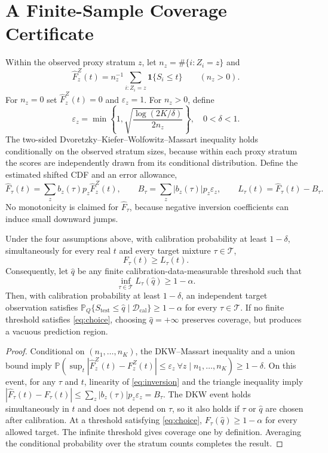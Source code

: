 \documentclass[twoside,11pt]{article}
\newcommand{\PR}{\mathbb{P}}
\begin{document}
\section{A Finite-Sample Coverage Certificate}
Within the observed proxy stratum $z$, let $n_z=\#\{i:Z_i=z\}$ and
\[ \widehat F_z^Z(t)= n_z^{-1}\sum_{i:Z_i=z}\mathbf 1\{S_i\leq t\}\qquad (n_z>0).\]
For $n_z=0$ set $\widehat F_z^Z(t)=0$ and $\varepsilon_z=1$. For $n_z>0$, define
\begin{equation}\label{eq:epsilon}
 \varepsilon_z=\min\left\{1,\sqrt{\frac{\log(2K/\delta)}{2n_z}}\right\}, \quad 0<\delta<1.
\end{equation}
The two-sided Dvoretzky--Kiefer--Wolfowitz--Massart inequality \citep{massart1990} holds conditionally on the observed stratum sizes, because within each proxy stratum the scores are independently drawn from its conditional distribution. Define the estimated shifted CDF and an error allowance,
\begin{equation}\label{eq:bound}
 \widehat F_\tau(t)=\sum_z b_z(\tau)p_z\widehat F_z^Z(t),\qquad
 B_\tau=\sum_z|b_z(\tau)|p_z\varepsilon_z,\qquad
 L_\tau(t)=\widehat F_\tau(t)-B_\tau.
\end{equation}
No monotonicity is claimed for $\widehat F_\tau$, because negative inversion coefficients can induce small downward jumps.

\begin{theorem}\label{thm:cert}
Under the four assumptions above, with calibration probability at least $1-\delta$, simultaneously for every real $t$ and every target mixture $\tau\in\mathcal T$,
\[F_\tau(t)\ge L_\tau(t).\]
Consequently, let $\widehat q$ be any finite calibration-data-measurable threshold such that
\begin{equation}\label{eq:choice}
 \inf_{\tau\in\mathcal T}L_\tau(\widehat q)\ge1-\alpha.
\end{equation}
Then, with calibration probability at least $1-\delta$, an independent target observation satisfies $\PR_Q\{S_{\mathrm{test}}\le \widehat q\mid \mathcal D_{\mathrm{cal}}\}\ge1-\alpha$ for every $\tau\in\mathcal T$. If no finite threshold satisfies \eqref{eq:choice}, choosing $\widehat q=+\infty$ preserves coverage, but produces a vacuous prediction region.
\end{theorem}
\begin{proof}
Conditional on $(n_1,\ldots,n_K)$, the DKW--Massart inequality and a union bound imply
$\PR(\sup_t|\widehat F_z^Z(t)-F_z^Z(t)|\le\varepsilon_z\ \forall z\mid n_1,\ldots,n_K)\ge1-\delta$.
On this event, for any $\tau$ and $t$, linearity of \eqref{eq:inversion} and the triangle inequality imply
$|\widehat F_\tau(t)-F_\tau(t)|\le\sum_z|b_z(\tau)|p_z\varepsilon_z=B_\tau$.
The DKW event holds simultaneously in $t$ and does not depend on $\tau$, so it also holds if $\tau$ or $\widehat q$ are chosen after calibration. At a threshold satisfying \eqref{eq:choice}, $F_\tau(\widehat q)\ge1-\alpha$ for every allowed target. The infinite threshold gives coverage one by definition. Averaging the conditional probability over the stratum counts completes the result.
\end{proof}
\end{document}
